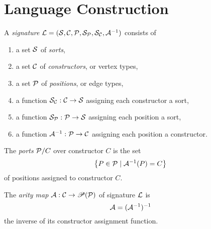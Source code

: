 \section{Language Construction}
\label{sec:language-construction}

\begin{definition}
  A \emph{signature}
  $\mathcal{L} = (\mathcal{S}, \mathcal{C}, \mathcal{P}, \mathcal{S}_{\mathcal{P}}, \mathcal{S}_{\mathcal{C}}, \mathcal{A}^{-1})$ consists of
  \begin{enumerate}
    \item a set $\mathcal{S}$ of \emph{sorts},
    \item a set $\mathcal{C}$ of \emph{constructors}, or vertex types,
    \item a set $\mathcal{P}$ of \emph{positions}, or edge types,
    \item a function $\mathcal{S}_{\mathcal{C}} : \mathcal{C} \to \mathcal{S}$ assigning each constructor a sort,
    \item a function $\mathcal{S}_{\mathcal{P}} : \mathcal{P} \to \mathcal{S}$ assigning each position a sort,
    \item a function $\mathcal{A}^{-1} : \mathcal{P} \to \mathcal{C}$ assigning each position a constructor.
  \end{enumerate}
\end{definition}

\begin{definition}
  The \emph{ports} $\mathcal{P}/C$ over constructor $C$ is the set
  \[ \left\{P \in \mathcal{P} \mid \mathcal{A}^{-1}(P) = C\right\} \]
  of positions assigned to constructor $C$.
\end{definition}

\begin{definition}
  The \emph{arity map} $\mathcal{A} : \mathcal{C} \to \mathscr{P}\mathopen{}\left(\mathcal{P}\right)\mathclose{}$ of signature $\mathcal{L}$ is
  \[ \mathcal{A} = (\mathcal{A}^{-1})^{-1} \]
  the inverse of its constructor assignment function.
\end{definition}
